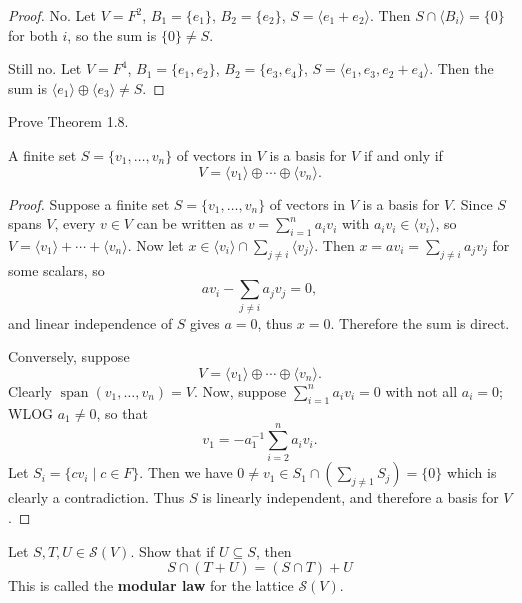 \begin{proof}
    No. Let $V = F^2$, $B_1 = \{e_1\}$, $B_2 = \{e_2\}$, $S = \langle e_1 + e_2 \rangle$. Then $S \cap \langle B_i \rangle = \{0\}$ for both $i$, so the sum is $\{0\} \ne S$.

    Still no. Let $V = F^4$, $B_1 = \{e_1, e_2\}$, $B_2 = \{e_3, e_4\}$, $S = \langle e_1, e_3, e_2 + e_4 \rangle$. Then the sum is $\langle e_1 \rangle \oplus \langle e_3 \rangle \ne S$.
\end{proof}

\begin{tcolorbox}[title=Problem 5, breakable]
    Prove Theorem 1.8.
\end{tcolorbox}

\begin{theorem}
    A finite set $S = \{v_1, \ldots, v_n\}$ of vectors in $V$
    is a basis for $V$ if and only if 
    \[V = \langle v_1 \rangle \oplus \cdots \oplus \langle v_n \rangle.\]
\end{theorem}

\begin{proof}
    Suppose a finite set $S = \{v_1, \ldots, v_n\}$ of vectors in $V$
    is a basis for $V$. Since $S$ spans $V$, every $v \in V$ can be written
    as $v = \sum_{i=1}^n a_i v_i$ with $a_i v_i \in \langle v_i \rangle$, so
    $V = \langle v_1 \rangle + \cdots + \langle v_n \rangle$.
    Now let $x \in \langle v_i \rangle \cap \sum_{j \ne i} \langle v_j \rangle$.
    Then $x = a v_i = \sum_{j \ne i} a_j v_j$ for some scalars, so
    \[a v_i - \sum_{j \ne i} a_j v_j = 0,\]
    and linear independence of $S$ gives $a = 0$, thus $x = 0$.
    Therefore the sum is direct.

    Conversely, suppose 
    \[V = \langle v_1 \rangle \oplus \cdots \oplus \langle v_n \rangle.\]
    Clearly $\operatorname{span}(v_1, \ldots, v_n) = V$.
    Now, suppose $\sum_{i=1}^n a_i v_i = 0$ with not all $a_i = 0$; 
    WLOG $a_1 \ne 0$, so that
    \[v_1 = -a_1^{-1} \sum_{i=2}^n a_i v_i.\]
    Let $S_i = \{c v_i \mid c \in F\}$.
    Then we have $0 \ne v_1 \in S_1 \cap ( \sum_{j \ne 1} S_j ) = \{0\}$
        which is clearly a contradiction. Thus $S$ is linearly independent,
        and therefore a basis for $V$.
\end{proof}

\begin{tcolorbox}[title=Problem 6, breakable]
    Let $S, T, U \in \mathcal{S}(V)$. Show that if $U \subseteq S$, then
    \[
        S \cap (T + U) = (S \cap T) + U
    \]
    This is called the \textbf{modular law} for the lattice $\mathcal{S}(V)$.
\end{tcolorbox}

